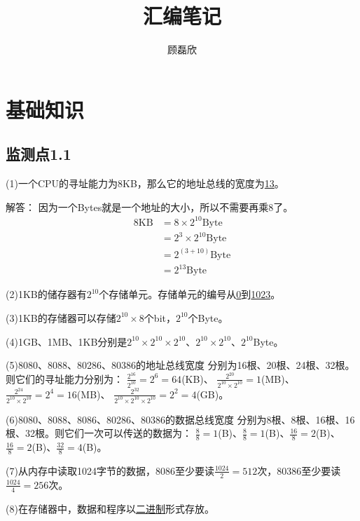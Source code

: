 \documentclass{elegantnote}
\title{汇编笔记}
\author{顾磊欣}
\begin{document}
    \maketitle
    \section{基础知识}
    \subsection*{监测点1.1}
    (1)一个CPU的寻址能力为8KB，那么它的地址总线的宽度为\underline{13}。\par
    解答：
    因为一个Bytes就是一个地址的大小，所以不需要再乘8了。
    \begin{align*}
        8\text{KB}&= 8\times2^{10}\text{Byte} \\
        & =2^3\times2^{10}\text{Byte} \\
        & = 2^{(3+10)}\text{Byte} \\
        & = 2^{13}\text{Byte}
    \end{align*}\par
    (2)1KB的储存器有\underline{$2^{10}$}个存储单元。存储单元的编号从\underline{0}到\underline{1023}。\par
    (3)1KB的存储器可以存储\underline{$2^{10}\times8$}个bit，\underline{$2^{10}$}个Byte。\par
    (4)1GB、1MB、1KB分别是\underline{$2^{10}\times2^{10}\times2^{10}$}、\underline{$2^{10}\times2^{10}$}、\underline{$2^{10}$}Byte。\par
    (5)8080、8088、80286、80386的地址总线宽度
    分别为16根、20根、24根、32根。则它们的寻址能力分别为：
    \underline{$\frac{2^{16}}{2^{10}}=2^6=64$}(KB)、
    \underline{$\frac{2^{20}}{2^{10}\times2^{10}}=1$}(MB)、
    \underline{$\frac{2^{24}}{2^{10}\times2^{10}}=2^4=16$}(MB)、
    \underline{$\frac{2^{32}}{2^{10}\times2^{10}\times2^{10}}=2^2=4$}(GB)。\par
    (6)8080、8088、8086、80286、80386的数据总线宽度
    分别为8根、8根、16根、16根、32根。则它们一次可以传送的数据为：
    \underline{$\frac{8}{8}=1$}(B)、\underline{$\frac{8}{8}=1$}(B)、\underline{$\frac{16}{8}=2$}(B)、\underline{$\frac{16}{8}=2$}(B)、\underline{$\frac{32}{8}=4$}(B)。\par
    (7)从内存中读取1024字节的数据，8086至少要读\underline{$\frac{1024}{2}=512$}次，80386至少要读\underline{$\frac{1024}{4}=256$}次。\par
    (8)在存储器中，数据和程序以\underline{二进制}形式存放。\par
    \newpage
\end{document}
